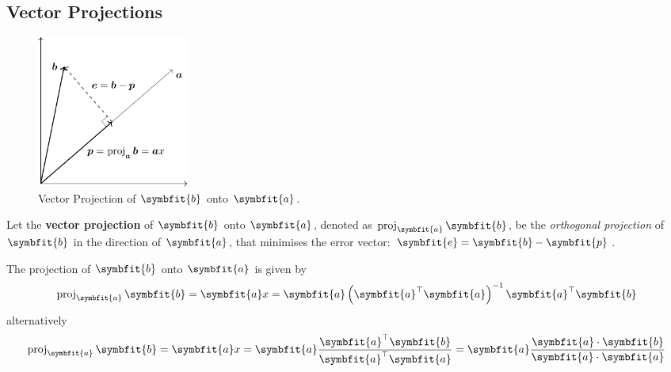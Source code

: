 \documentclass{article}
\begin{document}
\subsection{Vector Projections}
\begin{figure}[H]
    \centering
    \includegraphics[height=5cm, keepaspectratio]{figures/vector_projection.pdf}
    \caption{Vector Projection of \(\symbfit{b}\) onto \(\symbfit{a}\).}
\end{figure}
\begin{definition}
    Let the \textbf{vector projection} of \(\symbfit{b}\) onto
    \(\symbfit{a}\), denoted as \(\proj_{\symbfit{a}}\symbfit{b}\), be
    the \textit{orthogonal projection} of \(\symbfit{b}\)
    in the direction of \(\symbfit{a}\), that minimises the error
    vector: \(\symbfit{e}=\symbfit{b}-\symbfit{p}\).
\end{definition}
\begin{theorem}
    The projection of \(\symbfit{b}\) onto \(\symbfit{a}\) is given by
    \begin{equation*}
        \proj_{\symbfit{a}}\symbfit{b} = \symbfit{a} x = \symbfit{a} \left( \symbfit{a}^\top \symbfit{a} \right)^{-1}\symbfit{a}^\top \symbfit{b}
    \end{equation*}
    alternatively
    \begin{equation*}
        \proj_{\symbfit{a}}\symbfit{b} = \symbfit{a} x = \symbfit{a} \frac{\symbfit{a}^\top \symbfit{b}}{\symbfit{a}^\top \symbfit{a}} = \symbfit{a} \frac{\symbfit{a}\cdot\symbfit{b}}{\symbfit{a}\cdot\symbfit{a}}
    \end{equation*}
\end{theorem}
\end{document}
